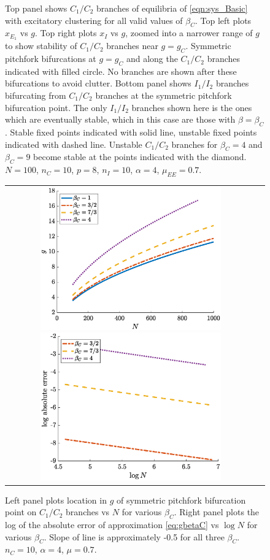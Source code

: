 \documentclass[reqno]{siamonline190516}
\begin{document}
\begin{figure}
    \caption{Top panel shows $C_1/C_2$ branches of equilibria of \cref{eqn:sys_Basic} with excitatory clustering for all valid values of $\beta_C$. Top left plots $x_{E_1}$ vs $g$. Top right plots $x_I$ vs $g$, zoomed into a narrower range of $g$ to show stability of $C_1/C_2$ branches near $g = g_C$. Symmetric pitchfork bifurcations at $g = g_C$ and along the $C_1/C_2$ branches indicated with filled circle. No branches are shown after these bifurcations to avoid clutter. Bottom panel shows $I_1/I_2$ branches bifurcating from $C_1/C_2$ branches at the symmetric pitchfork bifurcation point. The only $I_1/I_2$ branches shown here is the ones which are eventually stable, which in this case are those with $\beta = \beta_C$. Stable fixed points indicated with solid line, unstable fixed points indicated with dashed line. Unstable $C_1/C_2$ branches for $\beta_C = 4$ and $\beta_C = 9$ become stable at the points indicated with the diamond. $N = 100$, $n_C = 10$, $p = 8$, $n_I = 10$, $\alpha = 4$, $\mu_{EE} = 0.7$.}
    \label{fig:clusterBD2}
\end{figure}

\begin{figure}
    \centering
    \begin{tabular}{cc}
    \includegraphics[width=7.8cm]{images/clusterpitchgvsN.eps}
    \includegraphics[width=7.8cm]{images/clusterpitcherror.eps}
    \end{tabular}
    \caption{Left panel plots location in $g$ of symmetric pitchfork bifurcation point on $C_1/C_2$ branches vs $N$ for various $\beta_C$. Right panel plots the log of the absolute error of approximation \cref{eq:gbetaC} vs $\log N$ for various $\beta_C$. Slope of line is approximately -0.5 for all three $\beta_C$. $n_C = 10$, $\alpha = 4$, $\mu = 0.7$.}
    \label{fig:pitcherror}
\end{figure}
\end{document}
